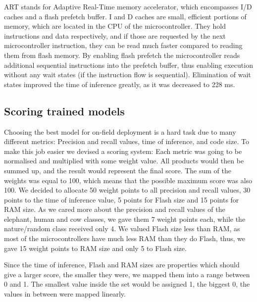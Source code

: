 ART stands for Adaptive Real-Time memory accelerator, which encompasses I/D caches and a flash prefetch buffer.
I and D caches are small, efficient portions of memory, which are located in the CPU of the microcontroller.
They hold instructions and data respectively, and if those are requested by the next microcontroller instruction, they can be read much faster compared to reading them from flash memory. 
By enabling flash prefetch the microcontroller reads additional sequential instructions into the prefetch buffer, thus enabling execution without any wait states (if the instruction flow is sequential).
Elimination of wait states improved the time of inference greatly, as it was decreased to 228 \si{\milli\second}.


\subsection{ Scoring trained models}\label{scoring_models}

Choosing the best model for on-field deployment is a hard task due to many different metrics: Precision and recall values, time of inference, and code size.
To make this job easier we devised a scoring system: Each metric was going to be normalised and multiplied with some weight value.
All products would then be summed up, and the result would represent the final score.
The sum of the weights was equal to 100, which means that the possible maximum score was also 100.
We decided to allocate 50 weight points to all precision and recall values, 30 points to the time of inference value, 5 points for Flash size and 15 points for RAM size.
As we cared more about the precision and recall values of the elephant, human and cow classes, we gave them 7 weight points each, while the nature/random class received only 4.
We valued Flash size less than RAM, as most of the microcontrollers have much less RAM than they do Flash, thus, we gave 15 weight points to RAM size and only 5 to Flash size.

Since the time of inference, Flash and RAM sizes are properties which should give a larger score, the smaller they were, we mapped them into a range between 0 and 1.
The smallest value inside the set would be assigned 1, the biggest 0, the values in between were mapped linearly.

